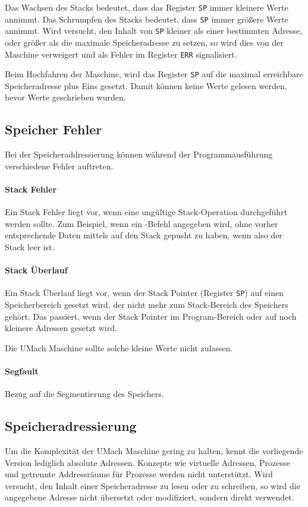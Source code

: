 Das Wachsen des Stacks bedeutet, dass das Register
\texttt{SP} immer kleinere Werte annimmt. Das Schrumpfen
des Stacks bedeutet, dass \texttt{SP} immer größere Werte annimmt. Wird
versucht, den Inhalt von \texttt{SP} kleiner als 
einer bestimmten Adresse,
oder größer als die maximale
Speicheradresse zu setzen, so wird dies von der Maschine verweigert und als
Fehler im Register \texttt{ERR} signalisiert.

Beim Hochfahren der Maschine, wird das Register \texttt{SP} auf die
maximal erreichbare Speicheradresse plus Eins gesetzt. Damit können keine Werte
gelesen werden, bevor Werte geschrieben wurden.

\subsection{Speicher Fehler}
\label{subsec:Speicherfehler}

Bei der Speicheraddressierung können während der Programmausführung
verschiedene Fehler auftreten.

\paragraph{Stack Fehler}
Ein Stack Fehler liegt vor, wenn eine ungültige Stack-Operation durchgeführt
werden sollte. Zum Beispiel, wenn ein -Befehl angegeben wird, ohne
vorher entsprechende Daten mittels  auf den Stack gepusht zu haben,
wenn also der Stack leer ist.


\paragraph{Stack Überlauf}
Ein Stack Überlauf liegt vor, wenn der Stack Pointer (Register \texttt{SP}) auf
einen Speicherbereich gesetzt wird, der nicht mehr zum Stack-Bereich des
Speichers gehört. Das passiert, wenn der Stack Pointer im Program-Bereich oder
auf noch kleinere Adressen gesetzt wird.

Die UMach Maschine sollte solche kleine Werte nicht zulassen.

\paragraph{Segfault}

Bezug auf die Segmentierung des Speichers.


\subsection{Speicheradressierung}

Um die Komplexität der UMach Maschine gering zu halten, kennt die vorliegende
Version lediglich absolute Adressen. Konzepte wie virtuelle Adressen,
Prozesse und getrennte Addressräume für Prozesse werden nicht
unterstützt. Wird versucht, den Inhalt einer Speicheradresse zu lesen oder zu
schreiben, so wird die angegebene Adresse nicht übersetzt oder modifiziert,
sondern direkt verwendet.

